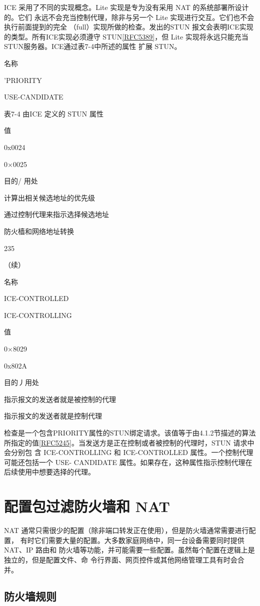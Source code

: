 ICE 采用了不同的实现概念。Lite 实现是专为没有采用 NAT 的系统部署所设计的。它们
永远不会充当控制代理，除非与另一个 Lite 实现进行交互。它们也不会执行前面提到的完全
（full）实现所做的检查。发出的STUN 报文会表明ICE实现的类型。所有ICE实现必须遵守
STUN\href{https://www.rfc-editor.org/rfc/rfc5389}{[RFC5389]}，但 Lite 实现将永远只能充当STUN服务器。ICE通过表7-4中所述的属性
扩展 STUN。

名称

'PRIORITY

USE-CANDIDATE

表7-4 由ICE 定义的 STUN 属性

值

0x0024

0×0025

目的/ 用处

计算出相关候选地址的优先级

通过控制代理来指示选择候选地址

防火樯和网络地址转换

235

（续）

名称

ICE-CONTROLLED

ICE-CONTROLLING

值

0×8029

0x802A

目的丿用处

指示报文的发送者就是被控制的代理

指示报文的发送者就是控制代理

检查是一个包含PRIORITY属性的STUN绑定请求。该值等于由4.1.2节描述的算法
所指定的值\href{https://www.rfc-editor.org/rfc/rfc5245}{[RFC5245]}。当发送方是正在控制或者被控制的代理时，STUN 请求中会分别包
含 ICE-CONTROLLING 和 ICE-CONTROLLED 属性。一个控制代理可能还包括一个 USE-
CANDIDATE 属性。如果存在，这种属性指示控制代理在后续使用中想要选择的代理。

\section{配置包过滤防火墙和 NAT}

NAT 通常只需很少的配置（除非端口转发正在使用），但是防火墙通常需要进行配置，
有时它们需要大量的配置。大多数家庭网络中，同一台设备需要同时提供NAT、IP 路由和
防火墙等功能，并可能需要一些配置。虽然每个配置在逻辑上是独立的，但是配置文件、命
令行界面、网页控件或其他网络管理工具有时会合并。

\subsection{防火墙规则}

